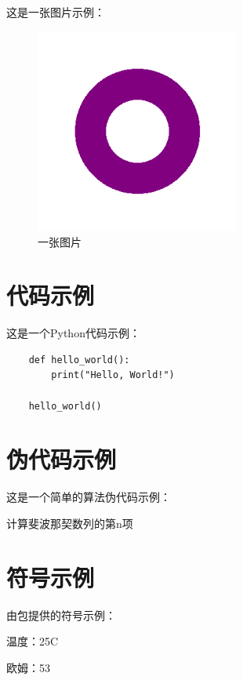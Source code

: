 \documentclass[]{ranreport} %
\begin{document}
这是一张图片示例：

\begin{figure}[htbp]
    \centering
    \includegraphics[width=0.6\textwidth]{assets/example.png}
    \caption{一张图片}
\end{figure}

\section{代码示例}

这是一个Python代码示例：

\begin{verbatim}
    def hello_world():
        print("Hello, World!")

    hello_world()
\end{verbatim}

\section{伪代码示例}

这是一个简单的算法伪代码示例：

\begin{algorithm}[H]
    \caption{计算斐波那契数列的第n项}
\end{algorithm}

\section{符号示例}

由包提供的符号示例：

温度：25\degree C

欧姆：53 \ohm
\end{document}
